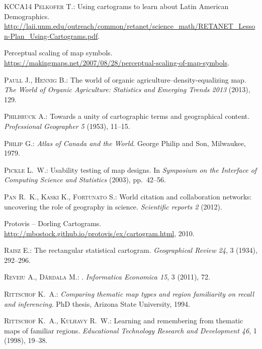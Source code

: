 \documentclass{egpubl}
\begin{document}
\begin{thebibliography}{\uppercase{KCCA{\etalchar{*}}14}}
\textsc{Pelkofer T.}:
\newblock Using cartograms to learn about {Latin American Demographics}.
\newblock
  \url{http://laii.unm.edu/outreach/common/retanet/science_math/RETANET_Lesson-Plan_Using-Cartograms.pdf}.

Perceptual scaling of map symbols.
\newblock
  \url{https://makingmaps.net/2007/08/28/perceptual-scaling-of-map-symbols}.

\textsc{Paull J., Hennig B.}:
\newblock The world of organic agriculture--density-equalizing map.
\newblock \emph{The World of Organic Agriculture: Statistics and Emerging
  Trends 2013} (2013), 129.

\textsc{Philbruck A.}:
\newblock Towards a unity of cartographic terms and geographical content.
\newblock \emph{Professional Geographer 5} (1953), 11--15.

\textsc{Philip G.}:
\newblock \emph{Atlas of Canada and the World}.
\newblock George Philip and Son, Milwaukee, 1979.

\textsc{Pickle L.~W.}:
\newblock Usability testing of map designs.
\newblock In \emph{Symposium on the Interface of Computing Science and
  Statistics} (2003), pp.~42--56.

\textsc{Pan R.~K., Kaski K., Fortunato S.}:
\newblock World citation and collaboration networks: uncovering the role of
  geography in science.
\newblock \emph{Scientific reports 2} (2012).

{Protovis -- Dorling Cartograms}.
\newblock \url{http://mbostock.github.io/protovis/ex/cartogram.html}, 2010.

\textsc{Raisz E.}:
\newblock The rectangular statistical cartogram.
\newblock \emph{Geographical Review 24}, 3 (1934), 292--296.

\textsc{Reveiu A., D{\^a}rdala M.}:
.
\newblock \emph{Informatica Economica 15}, 3 (2011), 72.

\textsc{Rittschof K.~A.}:
\newblock \emph{Comparing thematic map types and region familiarity on recall
  and inferencing}.
\newblock PhD thesis, Arizona State University, 1994.

\textsc{Rittschof K.~A., Kulhavy R.~W.}:
\newblock Learning and remembering from thematic maps of familiar regions.
\newblock \emph{Educational Technology Research and Development 46}, 1 (1998),
  19--38.


\end{thebibliography}
\end{document}
